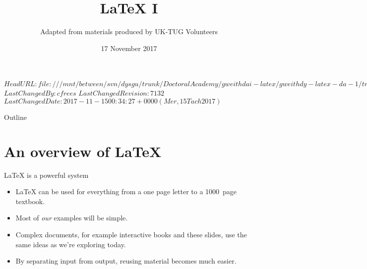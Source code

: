 \svnidlong
{$HeadURL: file:///mnt/between/svn/dysgu/trunk/DoctoralAcademy/gweithdai-latex/gweithdy-latex-da-1/training.tex $}
{$LastChangedBy: cfrees $}
{$LastChangedRevision: 7132 $}
{$LastChangedDate: 2017-11-15 00:34:27 +0000 (Mer, 15 Tach 2017) $}



\AtBeginDocument
{
  \renewcommand*{\LaTeX}{LaTeX}
  \renewcommand*{\LaTeXe}{LaTeX2e}
  \renewcommand*{\TeX}{TeX}
}

\title{\LaTeX{} I}
\subtitle{Adapted from materials produced by UK-TUG Volunteers}
\date{ 17 November 2017}




\begin{frame}
  \titlepage
\end{frame}

\maketitle


\tableofcontents

%
{
  \begin{frame}{Outline}
	\tableofcontents
  \end{frame}
}

\section{An overview of \LaTeX{}}

\begin{frame}{\LaTeX{} is a powerful system}

  \begin{itemize}
	\item \LaTeX{} can be used for everything from a one page letter to a 1000~page textbook.
	\item Most of \emph{our} examples will be simple.
	\item Complex documents, for example interactive books and these slides, use the same ideas as we're exploring today.
	\item By separating input from output, reusing material becomes much easier.
  \end{itemize}

\end{frame}

